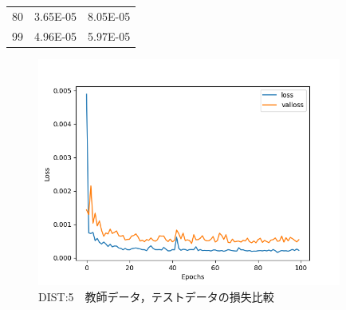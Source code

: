 \documentclass{jreport}		%
\begin{document}
\begin{table}
\begin{center}
\begin{tabular}{c|cc}
80&3.65E-05&8.05E-05 \\
99&4.96E-05&5.97E-05 \\ \hline
  \end{tabular}
  \end{center}
\end{table}

\begin{figure}[htbp]
 \begin{center}
  \includegraphics[width=100mm]{gain5_loss_hikaku.png}
 \end{center}
 \caption{DIST:5　教師データ，テストデータの損失比較}
 \label{fig:one}
\end{figure}
\end{document}
